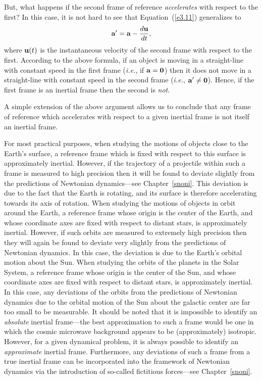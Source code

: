 But, what happens if the second frame of reference {\em accelerates}\/ with
respect to the first? In this case, it is not hard to see that Equation~(\ref{e3.11})
generalizes to
\begin{equation}
{\bf a}' = {\bf a} - \frac{d{\bf u}}{dt},
\end{equation}
where ${\bf u}(t)$ is the instantaneous velocity of the second frame
with respect to the first. According to the above formula, if an object is
moving   in a straight-line with constant speed in the first frame ({\em i.e.}, if  ${\bf a}={\bf 0}$) then it does not move  in a
straight-line with constant speed
in the second frame ({\em i.e.}, ${\bf a}'\neq{\bf 0}$). Hence,
if the first frame is an inertial frame then the second is {\em not}. 

A simple extension of the above argument allows us to conclude that any
frame of reference which accelerates with respect to a given inertial
frame is not itself an inertial frame.

For most practical purposes, when studying the motions of objects close to the
Earth's surface, a reference frame which is  fixed with
respect to this  surface is approximately inertial. However, 
if the trajectory of a projectile within such a frame is measured to high
precision then it will be found to deviate slightly from the predictions
of Newtonian dynamics---see Chapter~\ref{snoni}. This deviation
is due to the fact that the Earth is rotating, and its surface is therefore
accelerating towards its axis of rotation.  When studying the motions of
objects in orbit around the Earth, a reference frame whose origin
is the center of the Earth, and whose coordinate axes are fixed with respect
to distant stars, is approximately inertial. However, if such
orbits are measured to extremely high precision then they will
again be found to deviate very slightly from the predictions of Newtonian
dynamics. In this case, the deviation is due to the Earth's orbital
motion about the Sun. When studying the orbits of the planets
in the Solar System, a reference frame whose origin is the center of the Sun,  and whose coordinate axes are fixed with respect
to distant stars, is approximately inertial. In this case, any deviations
of the orbits from the predictions of Newtonian dynamics
due to the orbital motion of the Sun about the galactic center are
far too small to be measurable. It should be noted that it is impossible
to identify an {\em absolute}\/ inertial frame---the best approximation to such
a frame  would be one in which the cosmic microwave background appears
to be (approximately) isotropic. However, for a given dynamical problem, it is always
possible to identify an {\em approximate}\/ inertial frame. Furthermore, any
deviations of such a frame from a true inertial frame can be incorporated
into the framework of Newtonian dynamics via the introduction of so-called fictitious forces---see Chapter~\ref{snoni}.

